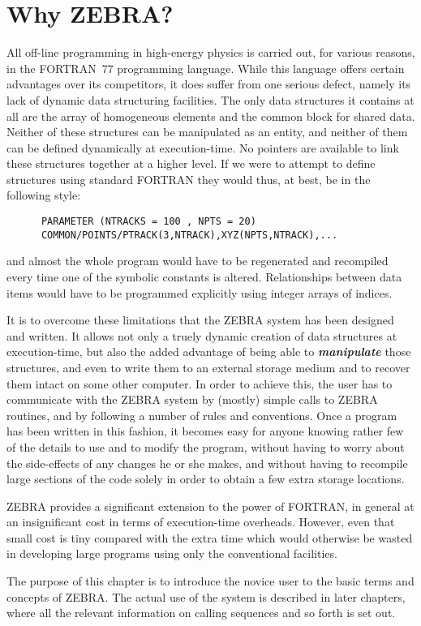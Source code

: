 \section{Why ZEBRA?}
\par All off-line programming in high-energy physics is carried out, for
various reasons, in the FORTRAN~77 programming language. While this
language offers certain advantages over its competitors, it does suffer
from one serious defect, namely its lack of dynamic data structuring
facilities. The only data structures it contains at all are the array of
homogeneous elements and the common block for shared data. Neither of
these structures can be manipulated as an entity, and neither of them
can be defined dynamically at execution-time. No pointers are available
to link these structures together at a higher level.
If we were to attempt to
define structures using standard FORTRAN they would thus, at best, be in
the following style:
\begin{verbatim}
      PARAMETER (NTRACKS = 100 , NPTS = 20)
      COMMON/POINTS/PTRACK(3,NTRACK),XYZ(NPTS,NTRACK),...
\end{verbatim}
and almost the whole program would have to be regenerated and recompiled
every time one of the symbolic constants is altered.
Relationships between data items would have to be programmed explicitly
using integer arrays of indices.
\par It is to overcome these limitations that the ZEBRA system has been
designed and written. It allows not only a truely dynamic
creation of data structures at execution-time, but also the added
advantage of being able to
{\bf\it manipulate} those structures, and even to write them to an external
storage medium and to recover them intact on some other computer.
In order to achieve this, the
user has to communicate with the ZEBRA system by (mostly) simple calls
to ZEBRA routines, and by following a number of rules and conventions.
Once a program has been written in this fashion, it becomes easy
for anyone knowing rather few of the details to use and to modify the
program, without having to worry about the side-effects of any changes
he or she makes, and without having to recompile large sections of the
code solely in order to obtain a few extra storage locations.
\par ZEBRA provides a significant extension to the power of FORTRAN, in
general at an insignificant cost in terms of execution-time overheads.
However, even that small cost is tiny compared with the extra time which
would otherwise be wasted in developing large programs using only the
conventional facilities.
\par The purpose of this chapter is to introduce the novice user to the basic
terms and concepts of ZEBRA. The actual use of the system
is described in later
chapters, where all the relevant information on calling sequences and so
forth is set out.
